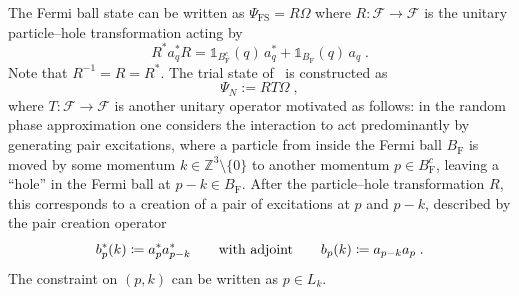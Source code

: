 \documentclass[12pt,a4paper]{article}
\numberwithin{equation}{section}
\newcommand{\cF}{\mathcal{F}}
\newcommand{\1}{\mathbb{I}}
\newcommand{\F}{\mathrm{F}}
\newcommand{\FS}{\mathrm{FS}}
\newcommand{\Z}{\mathbb{Z}}
\theoremstyle{plain}
\theoremstyle{definition}
\theoremstyle{remark}
\theoremstyle{plain}
\theoremstyle{definition}
\theoremstyle{remark}
\begin{document}
The Fermi ball state can be written as $ \Psi_{\FS} = R \Omega $ where $ R: \cF \to \cF $ is the unitary particle--hole transformation acting by
\begin{equation} \label{eq:R}
	R^* a_q^* R 	= \mathds{1}_{B_{\F}^c}(q) \, a_q^* 	+ \mathds{1}_{B_{\F}}(q) \, a_q \;.
\end{equation}
Note that $ R^{-1} = R = R^* $. The trial state of~\cite{CHN23} is constructed as
\begin{equation} \label{eq:Psitrial}
	\Psi_N := R T \Omega \;,
\end{equation}
where $ T: \cF \to \cF $ is another unitary operator motivated as follows: in the random phase approximation one considers the interaction to act predominantly by generating pair excitations, where a particle from inside the Fermi ball $ B_{\F} $ is moved by some momentum $ k \in \Z^3 \setminus \{ 0 \} $ to another momentum $ p \in B_{\F}^c $, leaving a ``hole'' in the Fermi ball at $ p-k \in B_{\F} $. After the particle--hole transformation $ R $, this corresponds to a creation of a pair of excitations at $ p $ and $ p-k $, described by the pair creation operator
\begin{equation} \label{eq:b}
	b^*_p(k) \coloneq a_p^* a_{p-k}^* 
	\qquad \textnormal{with adjoint} \qquad
	b_p(k) \coloneq a_{p-k} a_p \;.
\end{equation}
The constraint on $ (p,k) $ can be written as $ p \in L_k $.
\end{document}
